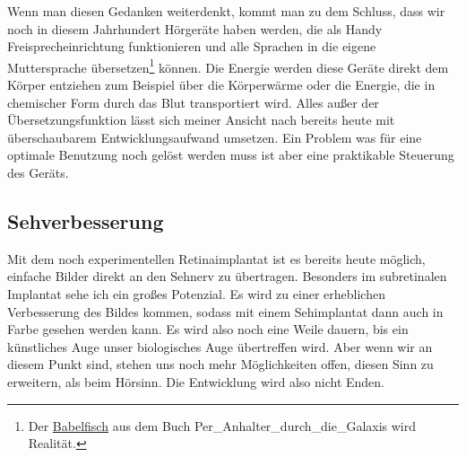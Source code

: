 Wenn man diesen Gedanken weiterdenkt, kommt man zu dem Schluss, dass wir noch in diesem Jahrhundert
Hörgeräte haben werden, die als Handy Freisprecheinrichtung funktionieren und alle Sprachen in die
\label{sec:Robin:future:hearing:Babel_Fish}
eigene Muttersprache übersetzen\footnote{Der
\href{http://de.wikipedia.org/wiki/Babelfisch}{Babelfisch} aus dem Buch \citetitle
{Per_Anhalter_durch_die_Galaxis} wird Realität.} können. Die Energie werden diese Geräte direkt dem
Körper entziehen zum Beispiel über die Körperwärme oder die Energie, die in chemischer Form durch das
Blut transportiert wird. Alles außer der Übersetzungsfunktion lässt sich meiner Ansicht nach bereits
heute mit überschaubarem Entwicklungsaufwand umsetzen. Ein Problem was für eine optimale Benutzung
noch gelöst werden muss ist aber eine praktikable Steuerung des Geräts.

\subsection{Sehverbesserung}
Mit dem noch experimentellen Retinaimplantat ist es bereits heute möglich, einfache Bilder direkt
an den Sehnerv zu übertragen. Besonders im subretinalen Implantat sehe ich ein großes Potenzial. Es
wird zu einer erheblichen Verbesserung des Bildes kommen, sodass mit einem Sehimplantat dann auch in
Farbe gesehen werden kann. Es wird also noch eine Weile dauern, bis ein künstliches Auge unser
biologisches Auge übertreffen wird. Aber wenn wir an diesem Punkt sind, stehen uns noch mehr
Möglichkeiten offen, diesen Sinn zu erweitern, als beim Hörsinn. Die Entwicklung wird also nicht
Enden.


